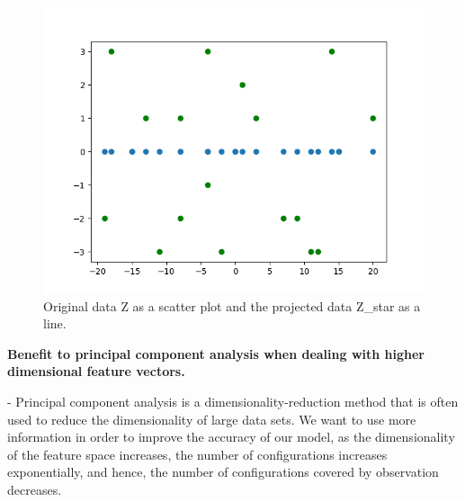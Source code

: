 \documentclass{exam}
\begin{document}
\vspace{5mm}

\vspace{5mm}
\begin{questions}

\begin{figure}[htp]
    \centering
    \includegraphics[width=17cm]{Figure_1.png}
    \caption{Original data Z as a scatter plot and the projected data Z\_star as a line.}
    \label{fig:plot}
\end{figure}

\question\textbf{Benefit to principal component analysis when dealing with higher dimensional feature vectors.}
\par\normalfont 
- Principal component analysis is a dimensionality-reduction method that is often used to reduce the dimensionality of large data sets.
We want to use more information in order to improve the accuracy of our model, as the dimensionality of the feature space increases, the number of configurations increases exponentially, and hence, the number of configurations covered by observation decreases.

\end{questions}
\clearpage
\end{document}
